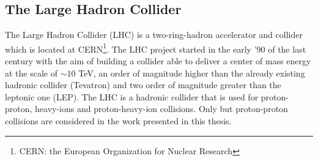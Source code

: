 \subsection{The Large Hadron Collider}

\label{sect:lhc}
The Large Hadron Collider (LHC)\cite{lhc} is a two-ring-hadron accelerator and collider which is located at CERN\footnote{CERN: the European Organization for Nuclear Research}. 
The LHC project started in the early '90 of the last century with the aim of building a collider able to deliver a center of mass energy at the scale of $\sim10$ TeV, an order of magnitude higher than the already existing hadronic collider (Tevatron) and two order of magnitude greater than the leptonic one (LEP).
The LHC is a hadronic collider that is used for proton-proton, heavy-ions and proton-heavy-ion collisions. Only  but  proton-proton collisions are considered in the work presented in this thesis.

